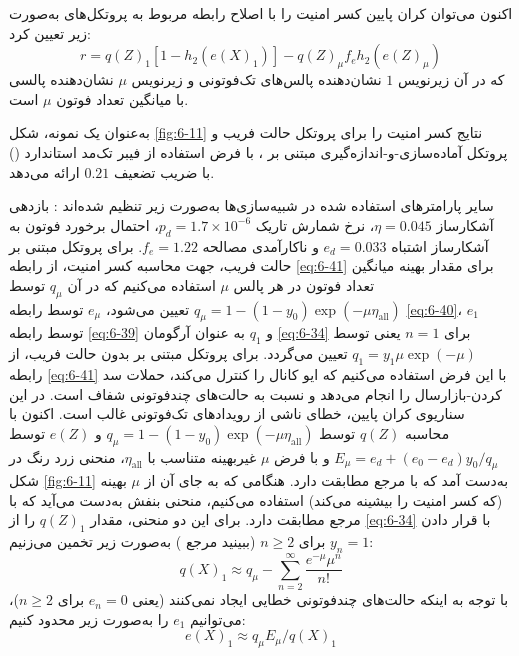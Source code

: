 اکنون می‌توان کران پایین کسر امنیت را با اصلاح رابطه مربوط به پروتکل‌های  به‌صورت زیر تعیین کرد:
\begin{equation}
	r = q(Z)_1 [1 - h_2(e(X)_1)] - q(Z)_\mu f_e h_2(e(Z)_\mu)
	\label{eq:6-41}
\end{equation}
که در آن زیرنویس $1$ نشان‌دهنده پالس‌های تک‌فوتونی و زیرنویس $\mu$ نشان‌دهنده پالسی با میانگین تعداد فوتون $\mu$ است.

به‌عنوان یک نمونه، شکل \ref{fig:6-11} نتایج کسر امنیت را برای پروتکل حالت فریب و پروتکل آماده‌سازی-و-اندازه‌گیری  مبتنی بر ، با فرض استفاده از فیبر تک‌مد استاندارد () با ضریب تضعیف $0.21$  ارائه می‌دهد.

سایر پارامترهای استفاده شده در شبیه‌سازی‌ها به‌صورت زیر تنظیم شده‌اند \cite{37, 71, 72, 73}: بازدهی آشکارساز $\eta = 0.045$، نرخ شمارش تاریک $p_d = 1.7 \times 10^{-6}$، احتمال برخورد فوتون به آشکارساز اشتباه $e_d = 0.033$ و ناکارآمدی مصالحه $f_e = 1.22$. برای پروتکل  مبتنی بر حالت فریب، جهت محاسبه کسر امنیت، از رابطه \eqref{eq:6-41} برای مقدار بهینه میانگین تعداد فوتون در هر پالس $\mu$ استفاده می‌کنیم که در آن $q_\mu$ توسط $q_\mu = 1 - (1 - y_0)\exp(-\mu \eta_{\text{all}})$ تعیین می‌شود، $e_\mu$ توسط رابطه \eqref{eq:6-40}، $e_1$ توسط رابطه \eqref{eq:6-39} و $q_1$ به عنوان آرگومان \eqref{eq:6-34} برای $n=1$ یعنی توسط $q_1 = y_1 \mu \exp(-\mu)$ تعیین می‌گردد. برای پروتکل  مبتنی بر  بدون حالت فریب، از رابطه \eqref{eq:6-41} با این فرض استفاده می‌کنیم که ایو کانال را کنترل می‌کند، حملات سد کردن-بازارسال را انجام می‌دهد و نسبت به حالت‌های چندفوتونی شفاف است. در این سناریوی کران پایین، خطای ناشی از رویدادهای تک‌فوتونی غالب است. اکنون با محاسبه $q(Z)$ توسط $q_\mu = 1 - (1 - y_0)\exp(-\mu \eta_{\text{all}})$ و $e(Z)$ توسط $E_\mu = e_d + (e_0 - e_d)y_0/q_\mu$ و با فرض $\mu$ غیربهینه متناسب با $\eta_{\text{all}}$، منحنی زرد رنگ در شکل \ref{fig:6-11} به‌دست آمد که با مرجع \cite{37} مطابقت دارد. هنگامی که به جای آن از $\mu$ بهینه (که کسر امنیت را بیشینه می‌کند) استفاده می‌کنیم، منحنی بنفش به‌دست می‌آید که با مرجع \cite{71} مطابقت دارد. برای این دو منحنی، مقدار $q(Z)_1$ را از \eqref{eq:6-34} با قرار دادن $y_n = 1$ برای $n \geq 2$ (ببینید مرجع \cite{70}) به‌صورت زیر تخمین می‌زنیم:
\begin{equation}
	q(X)_1 \approx q_\mu - \sum_{n=2}^{\infty} \frac{e^{-\mu} \mu^n}{n!}
	\label{eq:6-42}
\end{equation}
با توجه به اینکه حالت‌های چندفوتونی خطایی ایجاد نمی‌کنند (یعنی $e_n = 0$ برای $n \geq 2$)، می‌توانیم $e_1$ را به‌صورت زیر محدود کنیم:
\begin{equation}
	e(X)_1 \approx q_\mu E_\mu / q(X)_1
	\label{eq:6-43}
\end{equation}
